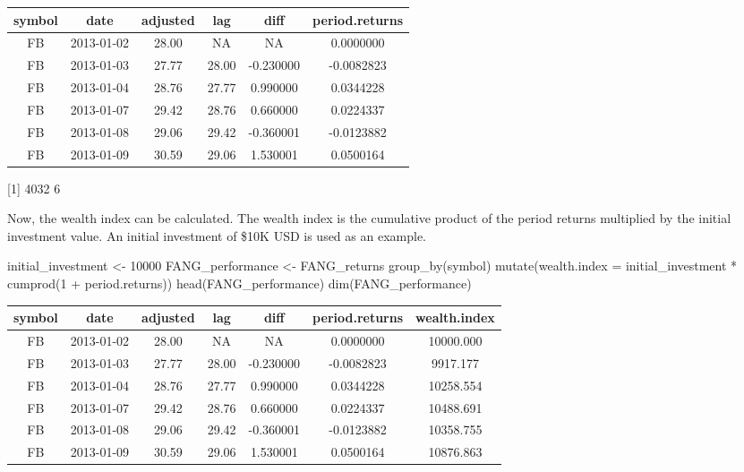 \begin{tabular}{cccccc}
\toprule
symbol & date & adjusted & lag & diff & period.returns\\
\midrule
FB & 2013-01-02 & 28.00 & NA & NA & 0.0000000\\
FB & 2013-01-03 & 27.77 & 28.00 & -0.230000 & -0.0082823\\
FB & 2013-01-04 & 28.76 & 27.77 & 0.990000 & 0.0344228\\
FB & 2013-01-07 & 29.42 & 28.76 & 0.660000 & 0.0224337\\
FB & 2013-01-08 & 29.06 & 29.42 & -0.360001 & -0.0123882\\
FB & 2013-01-09 & 30.59 & 29.06 & 1.530001 & 0.0500164\\
\bottomrule
\end{tabular}

{[}1{]} 4032 6

\hspace{20 mm}

Now, the wealth index can be calculated. The wealth index is the
cumulative product of the period returns multiplied by the initial
investment value. An initial investment of \$10K USD is used as an
example.

\begin{Schunk}
\begin{Sinput}
initial_investment <- 10000
FANG_performance <- FANG_returns %
    group_by(symbol) %
    mutate(wealth.index = initial_investment * cumprod(1 + period.returns)) 
head(FANG_performance)
dim(FANG_performance)
\end{Sinput}
\end{Schunk}

\begin{tabular}{ccccccc}
\toprule
symbol & date & adjusted & lag & diff & period.returns & wealth.index\\
\midrule
FB & 2013-01-02 & 28.00 & NA & NA & 0.0000000 & 10000.000\\
FB & 2013-01-03 & 27.77 & 28.00 & -0.230000 & -0.0082823 & 9917.177\\
FB & 2013-01-04 & 28.76 & 27.77 & 0.990000 & 0.0344228 & 10258.554\\
FB & 2013-01-07 & 29.42 & 28.76 & 0.660000 & 0.0224337 & 10488.691\\
FB & 2013-01-08 & 29.06 & 29.42 & -0.360001 & -0.0123882 & 10358.755\\
FB & 2013-01-09 & 30.59 & 29.06 & 1.530001 & 0.0500164 & 10876.863\\
\bottomrule
\end{tabular}

